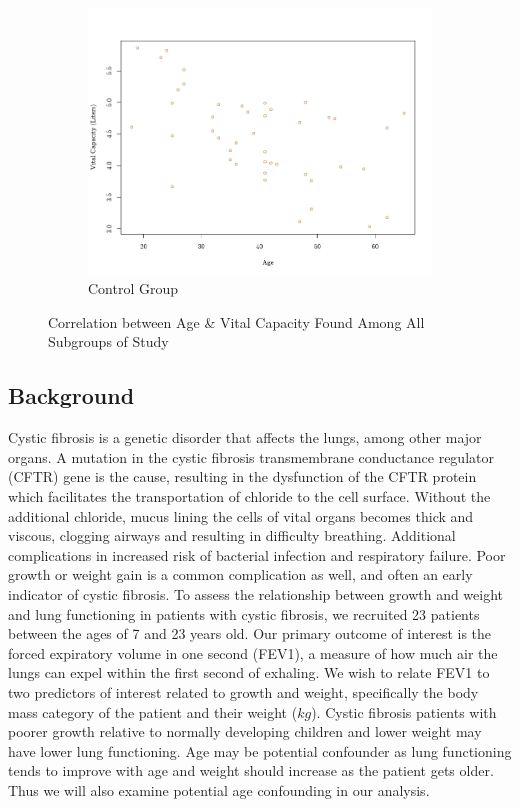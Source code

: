 \documentclass{article}
\begin{document}
\begin{figure}[h!]
			\hspace{0.05\textwidth}
			\begin{subfigure}[b]{0.3\textwidth}
				\includegraphics[width=\textwidth]{graphs/ScatterControl.png}
				\caption{Control Group}
				\label{fig:img3}
			\end{subfigure}
			\caption{Correlation between Age \& Vital Capacity Found Among All Subgroups of Study}
			\label{fig:three_images}
		\end{figure}



		\newpage

		\newpage
		\subsection*{Background}
		
		Cystic fibrosis is a genetic disorder that affects the lungs, among other major organs. A mutation in the cystic fibrosis transmembrane conductance regulator (CFTR) gene is the cause, resulting in the dysfunction of the CFTR protein which facilitates the transportation of chloride to the cell surface. Without the additional chloride, mucus lining the cells of vital organs becomes thick and viscous, clogging airways and resulting in difficulty breathing. Additional complications in increased risk of bacterial infection and respiratory failure. Poor growth or weight gain is a common complication as well, and often an early indicator of cystic fibrosis. To assess the relationship between growth and weight and lung functioning in patients with cystic fibrosis, we recruited 23 patients between the ages of 7 and 23 years old. Our primary outcome of interest is the forced expiratory volume in one second (FEV1), a measure of how much air the lungs can expel within the first second of exhaling. We wish to relate FEV1 to two predictors of interest related to growth and weight, specifically the body mass category of the patient and their weight ($kg$). Cystic fibrosis patients with poorer growth relative to normally developing children and lower weight may have lower lung functioning. Age may be potential confounder as lung functioning tends to improve with age and weight should increase as the patient gets older. Thus we will also examine potential age confounding in our analysis.
		
\end{document}
